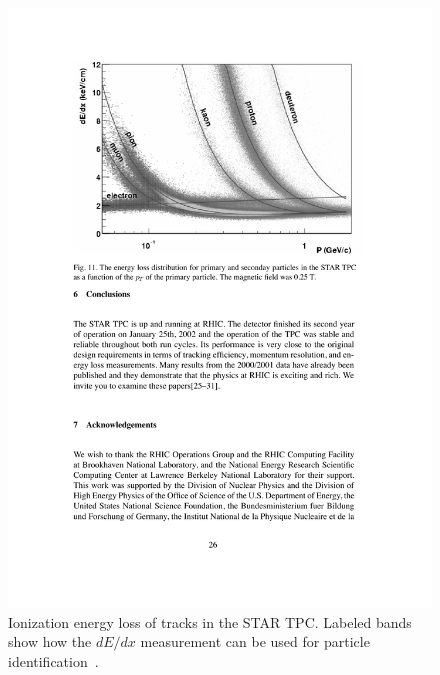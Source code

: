 \begin{figure}[htbp]
\begin{center}
\includegraphics[scale=1.0]{Plots/Detector/TPC_dedx.pdf}
\end{center}
\caption[Ionization Energy Loss in TPC]{Ionization energy loss of tracks in the STAR TPC. Labeled bands show how the $dE/dx$ measurement can be used for particle identification~\cite{tpcNIM}.}
\label{fig:TPC_dedx}
\end{figure}

